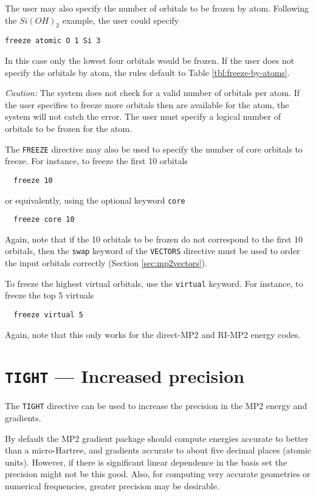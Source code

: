 The user may also specify the number of orbitals to be frozen by atom.
Following the $Si(OH)_2$ example, the user could specify
\begin{verbatim}
freeze atomic O 1 Si 3
\end{verbatim}
In this case only the lowest four orbitals would be frozen.  If the user does
not specify the orbitals by atom, the rules default to Table \ref{tbl:freeze-by-atoms}.

{\em Caution:\/} The system does not check for a valid number of orbitals per
atom.  If the user specifies to freeze more orbitals then are available for 
the atom, the system will not catch the error.  The user must specify a logical
number of orbitals to be frozen for the atom. 

The \verb+FREEZE+ directive may also be used to specify the number of 
core orbitals to freeze.  For instance, to freeze the first 10 orbitals
\begin{verbatim}
  freeze 10
\end{verbatim}
or equivalently, using the optional keyword \verb+core+
\begin{verbatim}
  freeze core 10
\end{verbatim}
Again, note that if the 10 orbitals to be frozen do not correspond to
the first 10 orbitals, then the \verb+swap+ keyword of the
\verb+VECTORS+ directive must be used to order the input orbitals
correctly (Section \ref{sec:mp2vectors}).

To freeze the highest virtual orbitals, use the \verb+virtual+
keyword.  For instance, to freeze the top 5 virtuals
\begin{verbatim}
  freeze virtual 5
\end{verbatim}
Again, note that this only works for the direct-MP2 and RI-MP2 energy
codes.

\section{{\tt TIGHT} --- Increased precision}

The \verb+TIGHT+ directive can be used to increase the precision
in the MP2 energy and gradients.

By default the MP2 gradient package should compute energies accurate
to better than a micro-Hartree, and gradients accurate to about five
decimal places (atomic units).  However, if there is significant
linear dependence in the basis set the precision might not be this
good.  Also, for computing very accurate geometries or numerical
frequencies, greater precision may be desirable.

